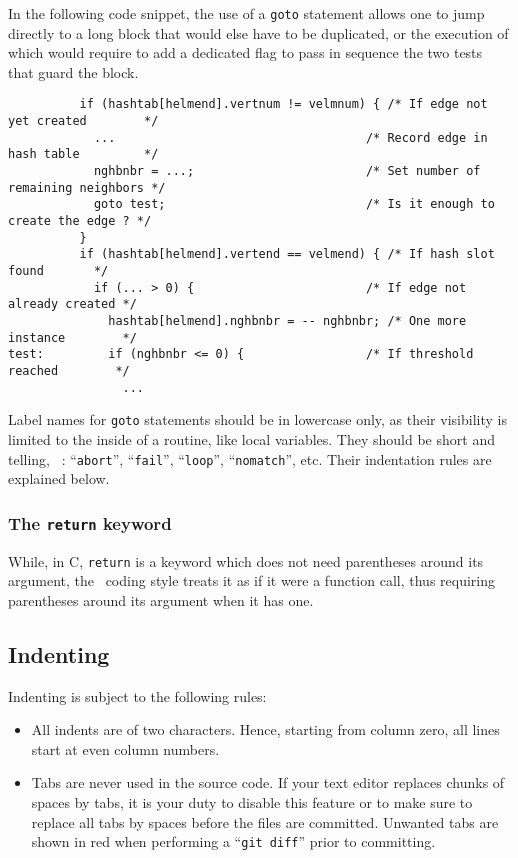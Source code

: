In the following code snippet, the use of a \texttt{goto} statement
allows one to jump directly to a long block that would else have to be
duplicated, or the execution of which would require to add a dedicated
flag to pass in sequence the two tests that guard the block.
\begin{lstlisting}
          if (hashtab[helmend].vertnum != velmnum) { /* If edge not yet created        */
            ...                                   /* Record edge in hash table         */
            nghbnbr = ...;                        /* Set number of remaining neighbors */
            goto test;                            /* Is it enough to create the edge ? */
          }
          if (hashtab[helmend].vertend == velmend) { /* If hash slot found       */
            if (... > 0) {                        /* If edge not already created */
              hashtab[helmend].nghbnbr = -- nghbnbr; /* One more instance        */
test:         if (nghbnbr <= 0) {                 /* If threshold reached        */
                ...
\end{lstlisting}

Label names for \texttt{goto} statements should be in lowercase only,
as their visibility is limited to the inside of a routine, like local
variables. They should be short and telling, \eg~: ``\texttt{abort}'',
``\texttt{fail}'', ``\texttt{loop}'', ``\texttt{nomatch}'', etc. Their
indentation rules are explained below.

\subsubsection{The \texttt{return} keyword}

While, in C, \texttt{return} is a keyword which does not need
parentheses around its argument, the \scotch\ coding style treats it
as if it were a function call, thus requiring parentheses around its
argument when it has one.

\subsection{Indenting}

Indenting is subject to the following rules:
\begin{itemize}
\item
  All indents are of two characters. Hence, starting from column zero,
  all lines start at even column numbers.
\item
  Tabs are never used in the source code. If your text editor replaces
  chunks of spaces by tabs, it is your duty to disable this feature or
  to make sure to replace all tabs by spaces before the files are
  committed. Unwanted tabs are shown in red when performing a
  ``\texttt{git diff}'' prior to committing.
\end{itemize}

